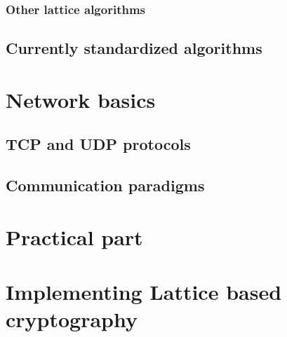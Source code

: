 \subsection{Other lattice algorithms}
\label{sec:lattice_other}


% 

% 

\section{Currently standardized algorithms}
\label{sec:currently_standardized}


\chapter{Network basics}
\label{ch:network_baics}


\section{TCP and UDP protocols}
\label{sec:tcp_and_udp}


\section{Communication paradigms}
\label{sec:comm_paradigms}


\chapter{Practical part}
\label{ch:pratical_part}


\chapter{Implementing Lattice based cryptography}


